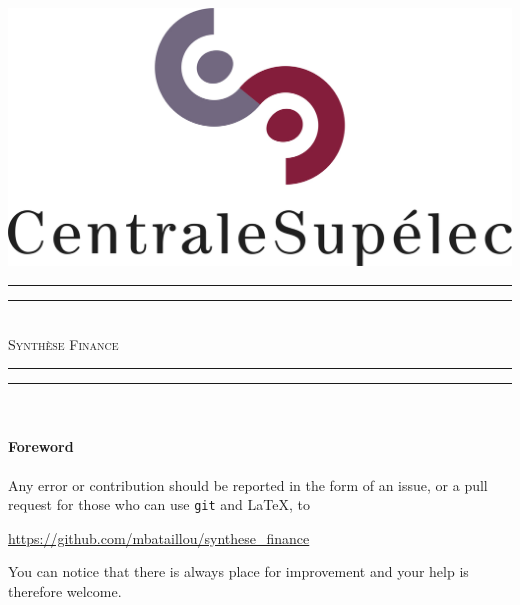 \begin{titlepage}
\begin{center}


\includegraphics[scale=0.5]{./img/logo_centralesup.jpg} \\[1.5cm]



\vfill
\rule{\textwidth}{1.6pt}\vspace*{-\baselineskip}\vspace*{2pt} %
\rule{\textwidth}{0.4pt}\\[\baselineskip] %
{ \huge  \textsc{Synthèse Finance} \\[0.4cm] }
\rule{\textwidth}{0.4pt}\vspace*{-\baselineskip}\vspace{3.2pt} %
\rule{\textwidth}{1.6pt}\\[1.5cm] %

\vfill
\paragraph{Foreword}
Any error or contribution should be reported
in the form of an issue, or a pull request for those
who can use \texttt{git} and \LaTeX, to
\begin{center}
  \url{https://github.com/mbataillou/synthese_finance}
\end{center}
You can notice that there is always place for improvement
and your help is therefore welcome.
\vspace{\baselineskip}


\end{center}
\end{titlepage}
